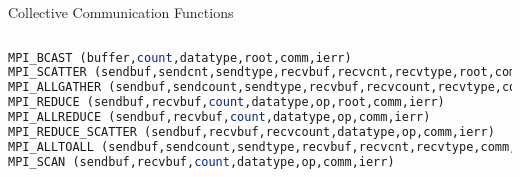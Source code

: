 \documentclass[9pt,c]{beamer}
\begin{document}
\begin{frame}{Collective Communication Functions}
\begin{block}{}
\begin{lstlisting}[basicstyle=\scriptsize\ttfamily,language=C]
  \end{lstlisting}
  \begin{lstlisting}[basicstyle=\scriptsize\ttfamily,language=Fortran]
MPI_BCAST (buffer,count,datatype,root,comm,ierr)
MPI_SCATTER (sendbuf,sendcnt,sendtype,recvbuf,recvcnt,recvtype,root,comm,ierr)MPI_GATHER (sendbuf,sendcnt,sendtype,recvbuf,recvcount,recvtype,root,comm,ierr)
MPI_ALLGATHER (sendbuf,sendcount,sendtype,recvbuf,recvcount,recvtype,comm,info)
MPI_REDUCE (sendbuf,recvbuf,count,datatype,op,root,comm,ierr)
MPI_ALLREDUCE (sendbuf,recvbuf,count,datatype,op,comm,ierr)
MPI_REDUCE_SCATTER (sendbuf,recvbuf,recvcount,datatype,op,comm,ierr)
MPI_ALLTOALL (sendbuf,sendcount,sendtype,recvbuf,recvcnt,recvtype,comm,ierr)
MPI_SCAN (sendbuf,recvbuf,count,datatype,op,comm,ierr)
  \end{lstlisting}
  \end{block}
\end{frame}
\end{document}
